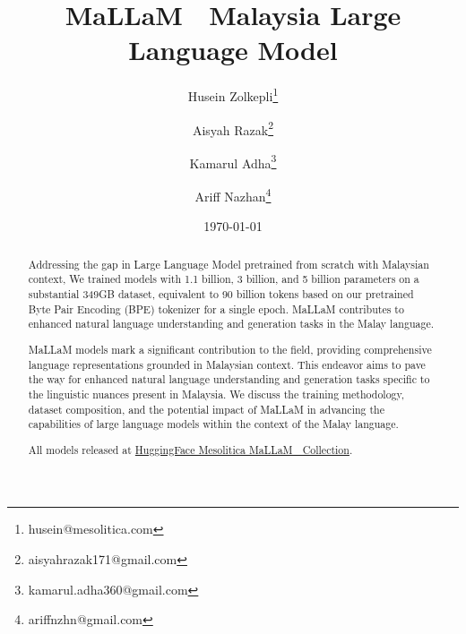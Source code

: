 \documentclass{article}
\title{MaLLaM 🌙 Malaysia Large Language Model}
\author{
  Husein Zolkepli\thanks{husein@mesolitica.com} \and 
  Aisyah Razak\thanks{aisyahrazak171@gmail.com} \and
  Kamarul Adha\thanks{kamarul.adha360@gmail.com} \and
  Ariff Nazhan\thanks{ariffnzhn@gmail.com}
}
\date{\today}
\begin{document}
\maketitle

\begin{abstract}
  Addressing the gap in Large Language Model pretrained from scratch with Malaysian context, We trained models with 1.1 billion, 3 billion, and 5 billion parameters on a substantial 349GB dataset, equivalent to 90 billion tokens based on our pretrained Byte Pair Encoding (BPE) tokenizer for a single epoch. MaLLaM contributes to enhanced natural language understanding and generation tasks in the Malay language.

  MaLLaM models mark a significant contribution to the field, providing comprehensive language representations grounded in Malaysian context. This endeavor aims to pave the way for enhanced natural language understanding and generation tasks specific to the linguistic nuances present in Malaysia. We discuss the training methodology, dataset composition, and the potential impact of MaLLaM in advancing the capabilities of large language models within the context of the Malay language.

  All models released at \href{https://huggingface.co/collections/mesolitica/mallam-6577b59d1e0b436ae75f930f}{HuggingFace Mesolitica MaLLaM 🌙 Collection}.

\end{abstract}
\end{document}
